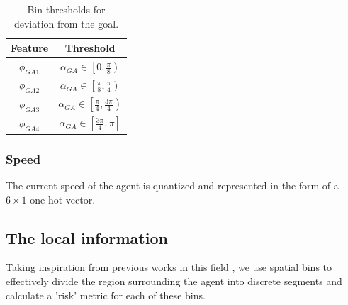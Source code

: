 \begin{table}[htbp]
    \label{deviation-from-goal-bins}
    \begin{center}
        \renewcommand{\arraystretch}{1.3}
        \begin{tabular}{|c|c|}
            \hline
            Feature & Threshold \\
            \hline
            $\phi_{GA1}$ & $\alpha_{GA} \in \left[ 0 , \frac{\pi}{8} \right)$ \\
            
            $\phi_{GA2}$ & $\alpha_{GA} \in \left[ \frac{\pi}{8} , \frac{\pi}{4} \right)$ \\
            
            $\phi_{GA3}$ & $\alpha_{GA} \in \left[ \frac{\pi}{4} , \frac{3\pi}{4} \right)$ \\
            
            $\phi_{GA4}$ & $\alpha_{GA} \in \left[ \frac{3\pi}{4} , \pi \right]$ \\
            \hline
        \end{tabular}
        \caption{Bin thresholds for deviation from the goal.}
    \end{center}
\end{table}

\subsubsection*{Speed}
The current speed of the agent is quantized and represented in the form of a $6 \times 1$ one-hot vector. 


\subsection*{The local information}
Taking inspiration from previous works in this field \cite{fahad_learning_2018} \cite{vasquez_inverse_2014}, we use spatial bins to effectively divide the region surrounding the agent into discrete segments and calculate a 'risk' metric for each of these bins.

